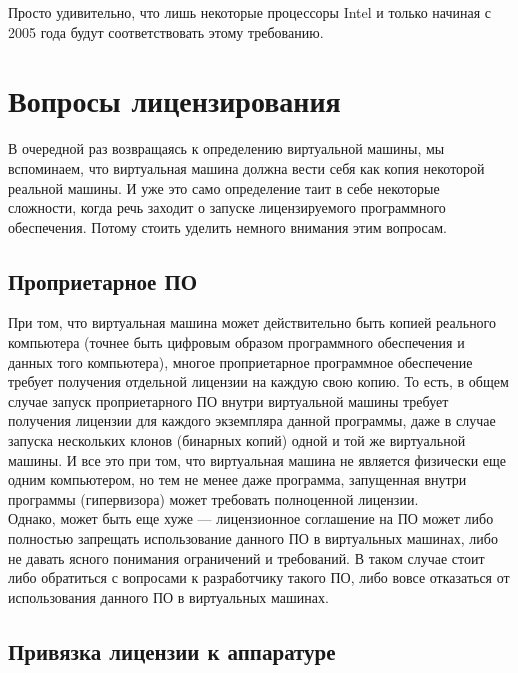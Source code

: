 \documentclass[14pt, a4paper]{article}
\begin{document}
Просто удивительно, что лишь некоторые процессоры Intel и только начиная с 2005
года будут соответствовать этому требованию.

\section*{Вопросы лицензирования}

В очередной раз возвращаясь к определению виртуальной машины, мы вспоминаем,
что виртуальная машина должна вести себя как копия некоторой реальной машины. И
уже это само определение таит в себе некоторые сложности, когда речь заходит о
запуске лицензируемого программного обеспечения. Потому стоить уделить немного
внимания этим вопросам.

\subsection*{Проприетарное ПО}

При том, что виртуальная машина может действительно быть копией реального
компьютера (точнее быть цифровым образом программного обеспечения и данных
того компьютера), многое проприетарное программное обеспечение требует получения
отдельной лицензии на каждую свою копию. То есть, в общем случае запуск
проприетарного ПО внутри виртуальной машины требует получения лицензии для
каждого экземпляра данной программы, даже в случае запуска нескольких клонов
(бинарных копий) одной и той же виртуальной машины. И все это при том, что
виртуальная машина не является физически еще одним компьютером, но тем не
менее даже программа, запущенная внутри программы (гипервизора) может требовать
полноценной лицензии.\\

Однако, может быть еще хуже — лицензионное соглашение на ПО может либо
полностью запрещать использование данного ПО в виртуальных машинах, либо не
давать ясного понимания ограничений и требований. В таком случае стоит либо
обратиться с вопросами к разработчику такого ПО, либо вовсе отказаться от
использования данного ПО в виртуальных машинах.

\subsection*{Привязка лицензии к аппаратуре}
\end{document}
